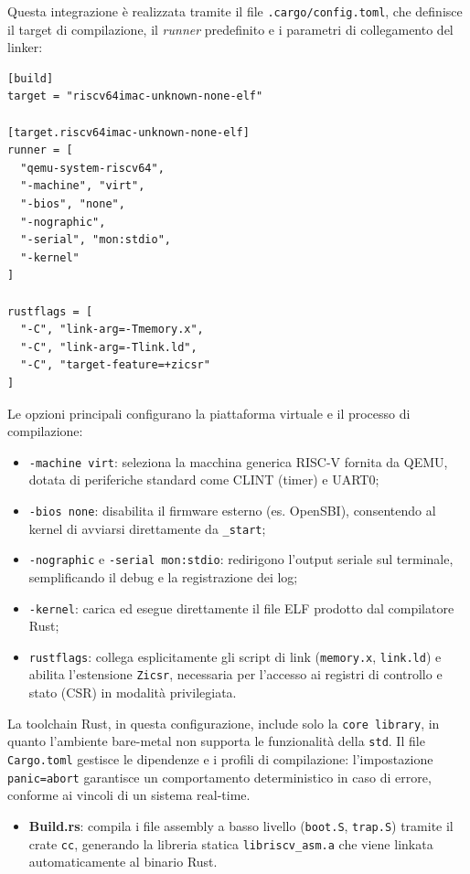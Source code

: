 \documentclass[italian, Lau, oneside]{sapthesis} %
\begin{document}
Questa integrazione è realizzata tramite il file \texttt{.cargo/config.toml}, che definisce il target di compilazione, il \emph{runner} predefinito e i parametri di collegamento del linker:

\begin{center}
\begin{verbatim}
[build]
target = "riscv64imac-unknown-none-elf"

[target.riscv64imac-unknown-none-elf]
runner = [
  "qemu-system-riscv64",
  "-machine", "virt",
  "-bios", "none",
  "-nographic",
  "-serial", "mon:stdio",
  "-kernel"
]

rustflags = [
  "-C", "link-arg=-Tmemory.x",
  "-C", "link-arg=-Tlink.ld",
  "-C", "target-feature=+zicsr"
]
\end{verbatim}
\end{center}

Le opzioni principali configurano la piattaforma virtuale e il processo di compilazione:
\begin{itemize}
    \item \texttt{-machine virt}: seleziona la macchina generica RISC-V fornita da QEMU, dotata di periferiche standard come CLINT (timer) e UART0;
    \item \texttt{-bios none}: disabilita il firmware esterno (es. OpenSBI), consentendo al kernel di avviarsi direttamente da \texttt{\_start};
    \item \texttt{-nographic} e \texttt{-serial mon:stdio}: redirigono l’output seriale sul terminale, semplificando il debug e la registrazione dei log;
    \item \texttt{-kernel}: carica ed esegue direttamente il file ELF prodotto dal compilatore Rust;
    \item \texttt{rustflags}: collega esplicitamente gli script di link (\texttt{memory.x}, \texttt{link.ld}) e abilita l’estensione \texttt{Zicsr}, necessaria per l’accesso ai registri di controllo e stato (CSR) in modalità privilegiata.
\end{itemize}

\medskip
La toolchain Rust, in questa configurazione, include solo la \texttt{core library}, in quanto l’ambiente bare-metal non supporta le funzionalità della \texttt{std}.  
Il file \texttt{Cargo.toml} gestisce le dipendenze e i profili di compilazione: l’impostazione \texttt{panic=abort} garantisce un comportamento deterministico in caso di errore, conforme ai vincoli di un sistema real-time.

\begin{itemize}
    \item \textbf{Build.rs}: compila i file assembly a basso livello (\texttt{boot.S}, \texttt{trap.S}) tramite il crate \texttt{cc}, generando la libreria statica \texttt{libriscv\_asm.a} che viene linkata automaticamente al binario Rust.
\end{itemize}
\end{document}
